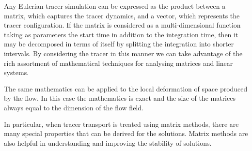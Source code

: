 \documentclass[11pt]{article}
\begin{document}
Any Eulerian tracer simulation can be expressed as the product between a matrix,
which captures the tracer dynamics, and a vector, which represents the tracer
configuration.  If the matrix is considered as a multi-dimensional function
taking as parameters the start time 
in addition to the integration time, then it may be decomposed in terms of
itself by splitting the integration into shorter intervals.  
By considering the tracer in this manner we can take advantage of the rich
assortment of mathematical techniques for analysing matrices and linear systems.

The same mathematics can be applied to the local deformation of space produced
by the flow.  In this case the mathematics is exact and the size of the matrices
always equal to the dimension of the flow field.

In particular, when tracer transport is treated using matrix methods, there
are many special properties that can be derived for the solutions.  
Matrix methods are also
helpful in understanding and improving the stability of solutions.


\end{document}
